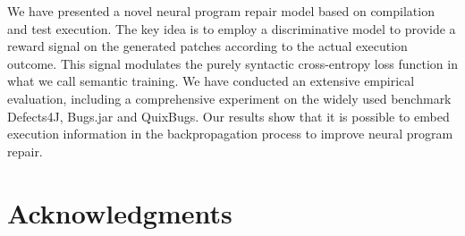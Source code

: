 We have presented a novel neural program repair model \approach  based on compilation and test execution. The key idea is to employ a discriminative model to provide a reward signal on the generated patches according to the actual execution outcome. This signal modulates the purely syntactic cross-entropy loss function in what we call semantic training.  
We have conducted an extensive empirical evaluation, including a comprehensive experiment on  the widely used benchmark Defects4J, Bugs.jar and QuixBugs.  
Our results  show that it is possible to embed execution information in the backpropagation process to improve neural program repair.

\section{Acknowledgments}

